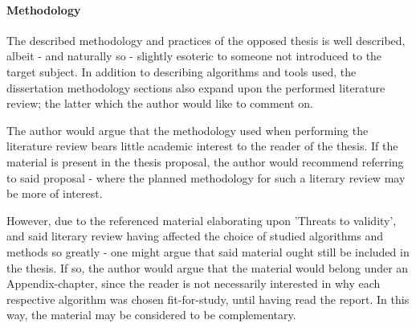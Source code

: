 
\paragraph{Methodology}
\label{par:methodology}
The described methodology and practices of the opposed thesis is well described, albeit - and naturally so - slightly esoteric to someone not introduced to the target subject.
In addition to describing algorithms and tools used, the dissertation methodology sections also expand upon the performed literature review; the latter which the author would like to comment on.

The author would argue that the methodology used when performing the literature review bears little academic interest to the reader of the thesis.
If the material is present in the thesis proposal, the author would recommend referring to said proposal - where the planned methodology for such a literary review may be more of interest.

However, due to the referenced material elaborating upon 'Threats to validity', and said literary review having affected the choice of studied algorithms and methods so greatly - one might argue that said material ought still be included in the thesis.
If so, the author would argue that the material would belong under an Appendix-chapter, since the reader is not necessarily interested in why each respective algorithm was chosen fit-for-study, until having read the report.
In this way, the material may be considered to be complementary.